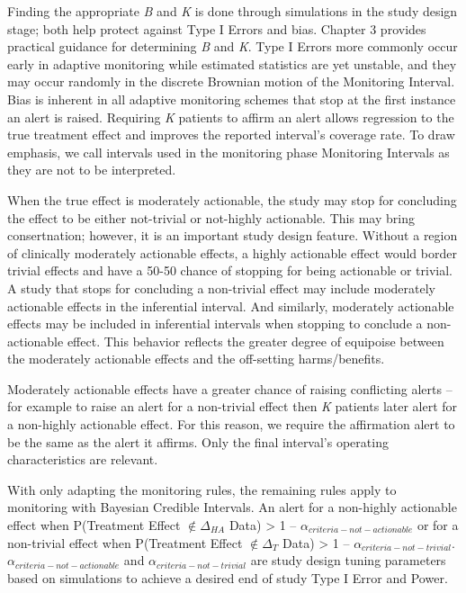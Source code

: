 \documentclass[12pt,oneside]{book}
\newlength{\li}\setlength{\li}{14.48pt}
\newlength{\di}\setlength{\di}{-3.5mm}
\theoremstyle{definition}
\theoremstyle{definition}
\theoremstyle{definition}
\theoremstyle{remark}
\begin{document}
Finding the appropriate \emph{B} and \emph{K} is done through
simulations in the study design stage; both help protect against Type I
Errors and bias. Chapter 3 provides practical guidance for determining
\emph{B} and \emph{K}. Type I Errors more commonly occur early in
adaptive monitoring while estimated statistics are yet unstable, and
they may occur randomly in the discrete Brownian motion of the
Monitoring Interval. Bias is inherent in all adaptive monitoring schemes
that stop at the first instance an alert is raised. Requiring \emph{K}
patients to affirm an alert allows regression to the true treatment
effect and improves the reported interval's coverage rate. To draw
emphasis, we call intervals used in the monitoring phase Monitoring
Intervals as they are not to be interpreted.

When the true effect is moderately actionable, the study may stop for
concluding the effect to be either not-trivial or not-highly actionable.
This may bring consertnation; however, it is an important study design
feature. Without a region of clinically moderately actionable effects, a
highly actionable effect would border trivial effects and have a 50-50
chance of stopping for being actionable or trivial. A study that stops
for concluding a non-trivial effect may include moderately actionable
effects in the inferential interval. And similarly, moderately
actionable effects may be included in inferential intervals when
stopping to conclude a non-actionable effect. This behavior reflects the
greater degree of equipoise between the moderately actionable effects
and the off-setting harms/benefits.

Moderately actionable effects have a greater chance of raising
conflicting alerts -- for example to raise an alert for a non-trivial
effect then \emph{K} patients later alert for a non-highly actionable
effect. For this reason, we require the affirmation alert to be the same
as the alert it affirms. Only the final interval's operating
characteristics are relevant.

With only adapting the monitoring rules, the remaining rules apply to
monitoring with Bayesian Credible Intervals. An alert for a non-highly
actionable effect when P(Treatment Effect \(\notin \Delta_{HA}\)
\textbar{} Data) \textgreater{} 1 --
\(\alpha_{criteria-not-actionable}\) or for a non-trivial effect when
P(Treatment Effect \(\notin \Delta_{T}\) \textbar{} Data) \textgreater{}
1 -- \(\alpha_{criteria-not-trivial}\).
\(\alpha_{criteria-not-actionable}\) and
\(\alpha_{criteria-not-trivial}\) are study design tuning parameters
based on simulations to achieve a desired end of study Type I Error and
Power.
\end{document}
